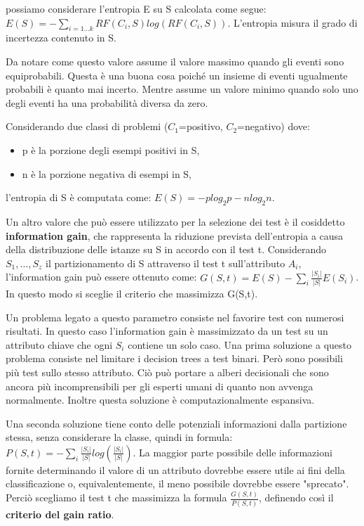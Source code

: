 \documentclass[a4paper]{extarticle}
\begin{document}
possiamo considerare l'entropia E su S calcolata come segue: $E(S) = -\sum_{i=1...k} RF(C_i,S)log(RF(C_i,S))$. L'entropia misura il grado di incertezza contenuto in S.

Da notare come questo valore assume il valore massimo quando gli eventi sono equiprobabili. Questa è una buona cosa poiché un insieme di eventi ugualmente probabili è quanto mai incerto. Mentre assume un valore minimo quando solo uno degli eventi ha una probabilità diversa da zero.

Considerando due classi di problemi ($C_1$=positivo, $C_2$=negativo) dove:
\begin{itemize}
\item p è la porzione degli esempi positivi in S,
\item n è la porzione negativa di esempi in S,
\end{itemize}

l'entropia di S è computata come: $E(S) = -p log_2 p - n log_2 n$.

Un altro valore che può essere utilizzato per la selezione dei test è il cosiddetto \textbf{information gain}, che rappresenta la riduzione prevista dell'entropia a causa della distribuzione delle istanze su S in accordo con il test t. Considerando $S_1,...,S_z$ il partizionamento di S attraverso il test t sull'attributo $A_i$, l'information gain può essere ottenuto come: $G(S,t) = E(S) - \sum_i \frac{|S_i|}{|S|}E(S_i)$. In questo modo si sceglie il criterio che massimizza G(S,t).

Un problema legato a questo parametro consiste nel favorire test con numerosi risultati. In questo caso l'information gain è massimizzato da un test su un attributo chiave che ogni $S_i$ contiene un solo caso. Una prima soluzione a questo problema consiste nel limitare i decision trees a test binari. Però sono possibili più test sullo stesso attributo. Ciò può portare a alberi decisionali che sono ancora più incomprensibili per gli esperti umani di quanto non avvenga normalmente. Inoltre questa soluzione è computazionalmente espansiva.

Una seconda soluzione tiene conto delle potenziali informazioni dalla partizione stessa, senza considerare la classe, quindi in formula: $P(S,t) = - \sum_i \frac{|S_i|}{|S|} log(\frac{|S_i|}{|S|})$. La maggior parte possibile delle informazioni fornite determinando il valore di un attributo dovrebbe essere utile ai fini della classificazione o, equivalentemente, il meno possibile dovrebbe essere "sprecato". Perciò scegliamo il test t che massimizza la formula $\frac{G(S,t)}{P(S,t)}$, definendo così il \textbf{criterio del gain ratio}.
\end{document}
